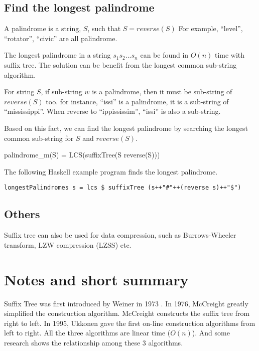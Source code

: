 \documentclass{article}
\begin{document}
\subsection{Find the longest palindrome}

A palindrome is a string, $S$, such that $S=reverse(S)$ For example,
``level'', ``rotator'', ``civic'' are all palindrome.

The longest palindrome in a string $s_1s_2...s_n$ can be found in
$O(n)$ time with suffix tree. The solution can be benefit from the
longest common sub-string algorithm.

For string $S$, if sub-string $w$ is a palindrome, then it must be
sub-string of $reverse(S)$ too. for instance, ``issi'' is a palindrome,
it is a sub-string of ``mississippi''. When reverse to
``ippississim'', ``issi'' is also a sub-string.

Based on this fact, we can find the longest palindrome by
searching the longest common sub-string for $S$ and $reverse(S)$.

\be
palindrome_m(S) = LCS(suffixTree(S \cup reverse(S)))
\ee

The following Haskell example program finds the longest palindrome.

\lstset{language=Haskell}
\begin{lstlisting}
longestPalindromes s = lcs $ suffixTree (s++"#"++(reverse s)++"$")
\end{lstlisting}

\subsection{Others}
Suffix tree can also be used for data compression, such as Burrows-Wheeler
transform, LZW compression (LZSS) etc. \cite{wiki-suffix-tree}

\section{Notes and short summary}

Suffix Tree was first introduced by Weiner in 1973 \cite{weiner}.
In 1976, McCreight greatly simplified the construction algorithm.
McCreight constructs the suffix tree from right to left. In 1995,
Ukkonen gave the first on-line construction algorithms from
left to right. All the three algorithms are linear time ($O(n)$).
And some research shows the relationship among these 3 algorithms.
\cite{GieKur97}
\end{document}
